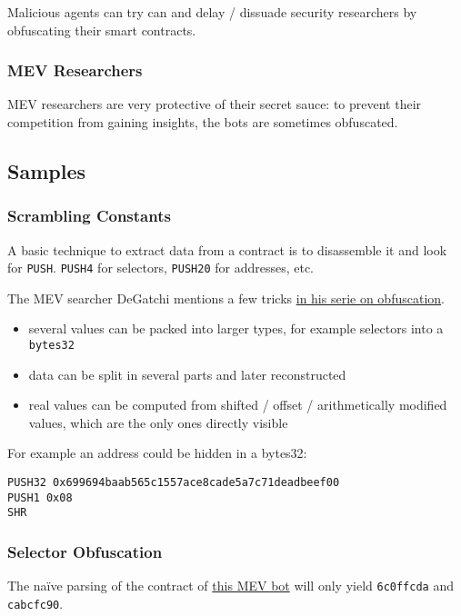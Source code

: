 Malicious agents can try can and delay / dissuade security researchers by obfuscating their smart contracts.

\subsubsection{MEV Researchers}

MEV researchers are very protective of their secret sauce: to prevent their competition from gaining insights, the bots are sometimes obfuscated.

\subsection{Samples}

\subsubsection{Scrambling Constants}

A basic technique to extract data from a contract is to disassemble it and look for \lstinline{PUSH}.
\lstinline{PUSH4} for selectors, \lstinline{PUSH20} for addresses, etc.

The MEV searcher DeGatchi mentions a few tricks \href{\urlarticleobfuscationinterface}{in his serie on obfuscation}.

\begin{itemize}
\item{several values can be packed into larger types, for example selectors into a \lstinline{bytes32}}
\item{data can be split in several parts and later reconstructed}
\item{real values can be computed from shifted / offset / arithmetically modified values, which are the only ones directly visible}
\end{itemize}

For example an address could be hidden in a bytes32:

\begin{lstlisting}
PUSH32 0x699694baab565c1557ace8cade5a7c71deadbeef00
PUSH1 0x08 
SHR
\end{lstlisting}

\subsubsection{Selector Obfuscation}

The naïve parsing of the contract of \href{\urladdressmevbot}{this MEV bot} will only yield \lstinline{6c0ffcda} and \lstinline{cabcfc90}.

